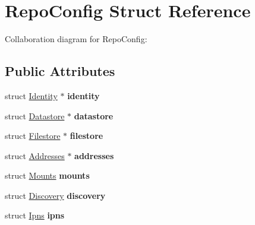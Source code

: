 \hypertarget{struct_repo_config}{}\section{Repo\+Config Struct Reference}
\label{struct_repo_config}


Collaboration diagram for Repo\+Config\+:
\subsection*{Public Attributes}
\begin{DoxyCompactItemize}
\item 
\mbox{\label{struct_repo_config_ae263062ff40d58f37cf7f784bb76b528}} 
struct \mbox{\hyperlink{struct_identity}{Identity}} $\ast$ {\bfseries identity}
\item 
\mbox{\label{struct_repo_config_a2f0f31ed80f90154033e0e178a24f712}} 
struct \mbox{\hyperlink{struct_datastore}{Datastore}} $\ast$ {\bfseries datastore}
\item 
\mbox{\label{struct_repo_config_a00622467577d36644881d6df9204ed15}} 
struct \mbox{\hyperlink{struct_filestore}{Filestore}} $\ast$ {\bfseries filestore}
\item 
\mbox{\label{struct_repo_config_ade6980950987a1fa50e169e672dbf228}} 
struct \mbox{\hyperlink{struct_addresses}{Addresses}} $\ast$ {\bfseries addresses}
\item 
\mbox{\label{struct_repo_config_af91a56313a8f414bcf7188d61bdce5fa}} 
struct \mbox{\hyperlink{struct_mounts}{Mounts}} {\bfseries mounts}
\item 
\mbox{\label{struct_repo_config_ab6c4b65b7fd9f7149e58fed0841d4eb7}} 
struct \mbox{\hyperlink{struct_discovery}{Discovery}} {\bfseries discovery}
\item 
\mbox{\label{struct_repo_config_ae3bf83aeb614c9fa48009f790c1034fc}} 
struct \mbox{\hyperlink{struct_ipns}{Ipns}} {\bfseries ipns}
\item 
\mbox{\label{struct_repo_config_adccefa6aeb1ea88a4d39beb6698011be}} 

\end{DoxyCompactItemize}

